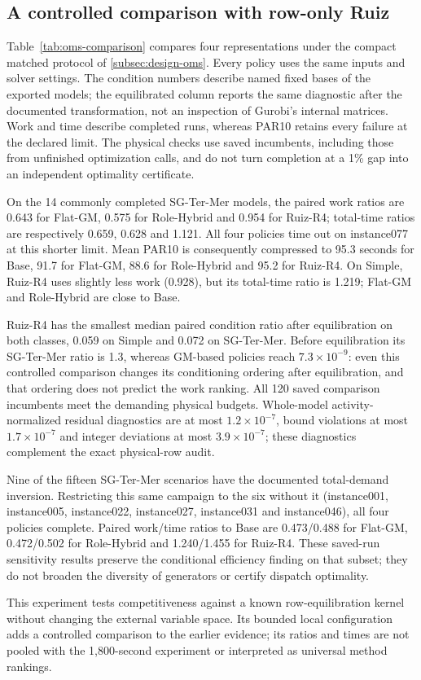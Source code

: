 \subsection{A controlled comparison with row-only Ruiz}
\label{subsec:results-ruiz}
Table~\ref{tab:oms-comparison} compares four representations under the compact matched
protocol of \cref{subsec:design-oms}. Every policy uses the same inputs and solver
settings. The condition numbers describe named fixed bases of the exported models;
the equilibrated column reports the same diagnostic after the documented transformation,
not an inspection of Gurobi's internal matrices. Work and time describe completed
runs, whereas PAR10 retains every failure at the declared limit. The physical checks
use saved incumbents, including those from unfinished optimization calls, and do not
turn completion at a 1\% gap into an independent optimality certificate.



On the 14 commonly completed SG-Ter-Mer models, the paired work ratios are 0.643 for
Flat-GM, 0.575 for Role-Hybrid and 0.954 for Ruiz-R4; total-time ratios are respectively
0.659, 0.628 and 1.121. All four policies time out on instance077 at this shorter limit.
Mean PAR10 is consequently compressed to 95.3 seconds for Base, 91.7 for Flat-GM,
88.6 for Role-Hybrid and 95.2 for Ruiz-R4. On Simple, Ruiz-R4 uses slightly less work
(0.928), but its total-time ratio is 1.219; Flat-GM and Role-Hybrid are close to Base.

Ruiz-R4 has the smallest median paired condition ratio after equilibration on both classes,
0.059 on Simple and 0.072 on SG-Ter-Mer. Before equilibration its SG-Ter-Mer ratio is
1.3, whereas GM-based policies reach $7.3\times10^{-9}$: even this controlled comparison
changes its conditioning ordering after equilibration, and that ordering does not predict
the work ranking. All 120 saved comparison incumbents meet the demanding physical budgets.
Whole-model activity-normalized residual diagnostics are at most $1.2\times10^{-7}$,
bound violations at most $1.7\times10^{-7}$ and integer deviations at most
$3.9\times10^{-7}$; these diagnostics complement the exact physical-row audit.

Nine of the fifteen SG-Ter-Mer scenarios have the documented total-demand inversion.
Restricting this same campaign to the six without it (instance001, instance005,
instance022, instance027, instance031 and instance046), all four policies complete.
Paired work/time ratios to Base are 0.473/0.488 for Flat-GM, 0.472/0.502 for
Role-Hybrid and 1.240/1.455 for Ruiz-R4. These saved-run sensitivity results
preserve the conditional efficiency finding on that subset; they do not broaden
the diversity of generators or certify dispatch optimality.

This experiment tests competitiveness against a known row-equilibration kernel without
changing the external variable space. Its bounded local configuration adds a controlled
comparison to the earlier evidence; its ratios and times are not pooled with the
1,800-second experiment or interpreted as universal method rankings.
